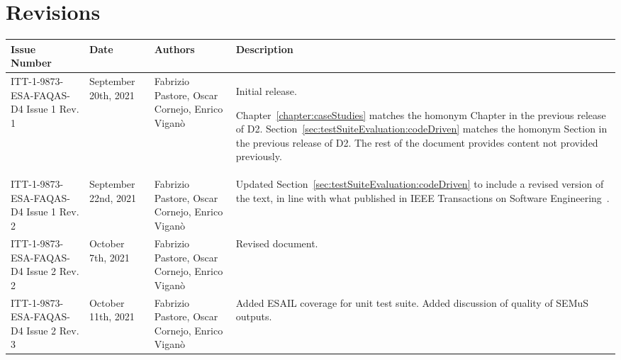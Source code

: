 
\section*{Revisions}
\label{sec:revisions}


\setlength\LTleft{0pt}
\setlength\LTright{0pt}
\tiny 
\begin{longtable}{|p{2cm}|p{1cm}|p{1.5cm}|p{9cm}|@{}}
\label{table:codeoperators} \\
\hline
\textbf{Issue Number}&\textbf{Date}&\textbf{Authors}&\textbf{Description}\\
\hline
ITT-1-9873-ESA-FAQAS-D4
Issue 1 Rev. 1&
September 20th, 2021&
Fabrizio Pastore, Oscar Cornejo, Enrico Viganò&
\begin{minipage}{8cm}
Initial release.

Chapter~\ref{chapter:caseStudies} matches the homonym Chapter in the previous release of D2.
Section~\ref{sec:testSuiteEvaluation:codeDriven} matches the homonym Section in the previous release of D2.
The rest of the document provides content not provided previously.
\end{minipage}
\\
\hline
ITT-1-9873-ESA-FAQAS-D4
Issue 1 Rev. 2&
September 22nd, 2021&
Fabrizio Pastore, Oscar Cornejo, Enrico Viganò&
\begin{minipage}{8cm}
Updated Section~\ref{sec:testSuiteEvaluation:codeDriven} to include a revised version of the text, in line with what published in IEEE Transactions on Software Engineering~\cite{Oscar:TSE}.
\end{minipage}
\\
\hline
ITT-1-9873-ESA-FAQAS-D4
Issue 2 Rev. 2&
October 7th, 2021&
Fabrizio Pastore, Oscar Cornejo, Enrico Viganò&
\begin{minipage}{8cm}
Revised document.
\end{minipage}
\\
\hline

ITT-1-9873-ESA-FAQAS-D4
Issue 2 Rev. 3&
October 11th, 2021&
Fabrizio Pastore, Oscar Cornejo, Enrico Viganò&
\begin{minipage}{8cm}
Added ESAIL coverage for unit test suite. Added discussion of quality of SEMuS outputs.
\end{minipage}
\\
\hline
                                                    
\end{longtable}
\normalsize

\clearpage
